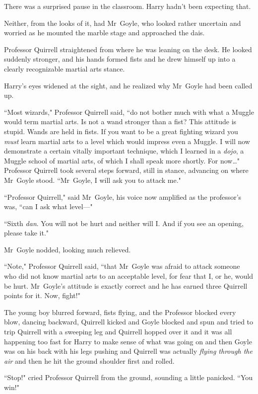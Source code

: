 There was a surprised pause in the classroom. Harry hadn't been expecting that.

Neither, from the looks of it, had Mr~Goyle, who looked rather uncertain and worried as he mounted the marble stage and approached the dais.

Professor Quirrell straightened from where he was leaning on the desk. He looked suddenly stronger, and his hands formed fists and he drew himself up into a clearly recognizable martial arts stance.

Harry's eyes widened at the sight, and he realized why Mr~Goyle had been called up.

``Most wizards," Professor Quirrell said, ``do not bother much with what a Muggle would term martial arts. Is not a wand stronger than a fist? This attitude is stupid. Wands are held in fists. If you want to be a great fighting wizard you \emph{must} learn martial arts to a level which would impress even a Muggle. I will now demonstrate a certain vitally important technique, which I learned in a \emph{dojo}, a Muggle school of martial arts, of which I shall speak more shortly. For now{\ldots}" Professor Quirrell took several steps forward, still in stance, advancing on where Mr~Goyle stood. ``Mr~Goyle, I will ask you to attack me."

``Professor Quirrell," said Mr~Goyle, his voice now amplified as the professor's was, ``can I ask what level—"

``Sixth \emph{dan}. You will not be hurt and neither will I\@. And if you see an opening, please take it."

Mr~Goyle nodded, looking much relieved.

``Note," Professor Quirrell said, ``that Mr~Goyle was afraid to attack someone who did not know martial arts to an acceptable level, for fear that I, or he, would be hurt. Mr~Goyle's attitude is exactly correct and he has earned three Quirrell points for it. Now, fight!"

The young boy blurred forward, fists flying, and the Professor blocked every blow, dancing backward, Quirrell kicked and Goyle blocked and spun and tried to trip Quirrell with a sweeping leg and Quirrell hopped over it and it was all happening too fast for Harry to make sense of what was going on and then Goyle was on his back with his legs pushing and Quirrell was actually \emph{flying through the air} and then he hit the ground shoulder first and rolled.

``Stop!" cried Professor Quirrell from the ground, sounding a little panicked. ``You win!"

